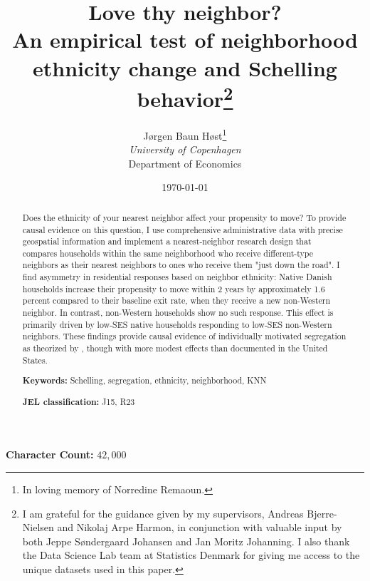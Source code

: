 \documentclass[11pt,a4paper]{article}
\author {
        Jørgen Baun Høst\thanks{In loving memory of Norredine Remaoun.}\\
        \small \textit{University of Copenhagen} \\
        \small Department of Economics}
\title{Love thy neighbor?\\
\vspace{0.35cm}
\large An empirical test of neighborhood ethnicity change and Schelling behavior\thanks{I am grateful for the guidance given by my supervisors, Andreas Bjerre-Nielsen and Nikolaj Arpe Harmon, in conjunction with valuable input by both Jeppe Søndergaard Johansen and Jan Moritz Johanning. I also thank the Data Science Lab team at Statistics Denmark for giving me access to the unique datasets used in this paper.}
\vspace{0.35cm}
}
\date{\today}
\begin{document}
\begin{spacing}{1}
\maketitle    
\end{spacing}

\vspace*{-1cm}
\begin{abstract}
\noindent
Does the ethnicity of your nearest neighbor affect your propensity to move? To provide causal evidence on this question, I use comprehensive administrative data with precise geospatial information and implement a nearest-neighbor research design that compares households within the same neighborhood who receive different-type neighbors as their nearest neighbors to ones who receive them "just down the road". I find asymmetry in residential responses based on neighbor ethnicity: Native Danish households increase their propensity to move within 2 years by approximately 1.6 percent compared to their baseline exit rate, when they receive a new non-Western neighbor. In contrast, non-Western households show no such response. This effect is primarily driven by low-SES native households responding to low-SES non-Western neighbors. These findings provide causal evidence of individually motivated segregation as theorized by \textcite{schelling1971dynamic}, though with more modest effects than documented in the United States.

\medskip
\noindent
\textbf{Keywords:} Schelling, segregation, ethnicity, neighborhood, KNN

\medskip
\noindent
\textbf{JEL classification:} J15, R23 
\end{abstract}


\newpage 
\begingroup
\begin{spacing}{1.25}
\tableofcontents
\end{spacing}
\endgroup


\vspace{1.5cm}
\begin{center}
\textbf{Character Count:} $42,000$ 
\end{center}

\pagebreak


\pagebreak

 

\pagebreak

 

\pagebreak

 

\pagebreak



\pagebreak

\printbibliography

\pagebreak


\appendix
\appendixpage


\end{document}

